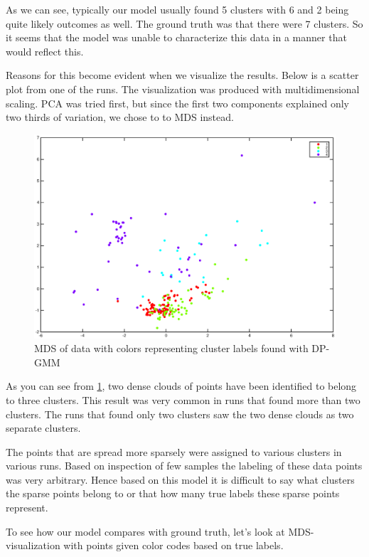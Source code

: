 \documentclass[a4paper]{article}
\begin{document}
As we can see, typically our model usually found 5 clusters with 6 and 2 being quite likely outcomes as well. The ground truth was that there were 7 clusters. So it seems that the model was unable to characterize this data in a manner that would reflect this.

Reasons for this become evident when we visualize the results. Below is a scatter plot from one of the runs. The visualization was produced with multidimensional scaling. PCA was tried first, but since the first two components explained only two thirds of variation, we chose to to MDS instead. 

\begin{figure}[H]
	\includegraphics[trim={3.5cm 1.5cm 3cm 1.3cm},clip,scale=0.45]{5000_normalized_data_1.eps}
	\caption{MDS of data with colors representing cluster labels found with DP-GMM}
	\label{mds_unsupervised}
\end{figure}

As you can see from \ref{mds_unsupervised}, two dense clouds of points have been identified to belong to three clusters. This result was very common in runs that found more than two clusters. The runs that found only two clusters saw the two dense clouds as two separate clusters.

 The points that are spread more sparsely were assigned to various clusters in various runs. Based on inspection of few samples the labeling of these data points was very arbitrary. Hence based on this model it is difficult to say what clusters the sparse points belong to or that how many true labels these sparse points represent.

To see how our model compares with ground truth, let's look at MDS-visualization with points given color codes based on true labels.
\end{document}
